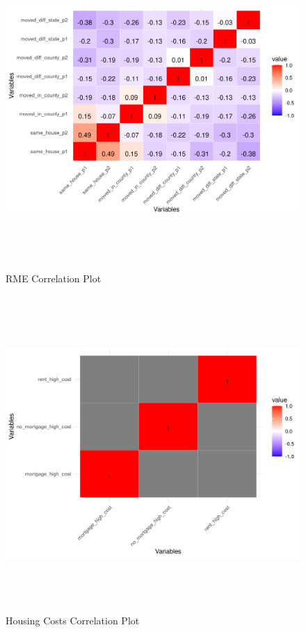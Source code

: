  \begin{figure}[htbp]
    \centering
     \includegraphics[width=1\textwidth, height=12cm]{plots/correlations/RMP_prob_corr.png}
     \caption{RME Correlation Plot}
 \end{figure}

 \begin{figure}[htbp]
    \centering
     \includegraphics[width=1\textwidth, height=12cm]{plots/correlations/cost_prob_corr.png}
     \caption{Housing Costs Correlation Plot}
 \end{figure}

